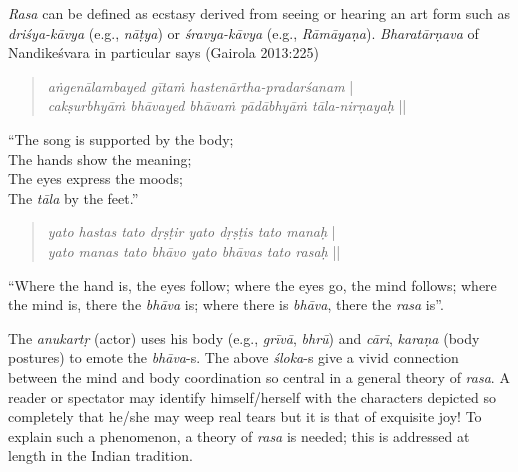 \textsl{Rasa} can be defined as ecstasy derived from seeing or hearing an art form such as \textsl{driśya-kāvya} (e.g., \textsl{nāṭya}) or \textsl{śravya-kāvya} (e.g., \textsl{Rāmāyaṇa}). \textsl{Bharatārṇava} of Nandikeśvara in particular says (Gairola 2013:225)
\begin{quote}
\textsl{aṅgenālambayed gītaṁ hastenārtha-pradarśanam} |\\[2pt]
\textsl{cakṣurbhyāṁ bhāvayed bhāvaṁ pādābhyāṁ tāla-nirṇayaḥ} ||
\end{quote}
``The song is supported by the body;\\[1pt]
The hands show the meaning;\\[1pt]
The eyes express the moods;\\[1pt]
The \textsl{tāla} by the feet.''
\begin{quote}
\textsl{yato hastas tato dṛṣṭir yato dṛṣṭis tato manaḥ} |\\[2pt]
\textsl{yato manas tato bhāvo yato bhāvas tato rasaḥ} ||
\end{quote}

``Where the hand is, the eyes follow; where the eyes go, the mind follows; where the mind is, there the \textsl{bhāva} is; where there is \textsl{bhāva}, there the \textsl{rasa} is”.

The \textsl{anukartṛ} (actor) uses his body (e.g., \textsl{grīvā}, \textsl{bhrū}) and \textsl{cāri}, \textsl{karaṇa} (body postures) to emote the \textsl{bhāva}-s. The above \textsl{śloka}-s give a vivid connection between the mind and body coordination so central in a general theory of \textsl{rasa}. A reader or spectator may identify himself/herself with the characters depicted so completely that he/she may weep real tears but it is that of exquisite joy! To explain such a phenomenon, a theory of \textsl{rasa} is needed; this is addressed at length in the Indian tradition. 

\newpage

